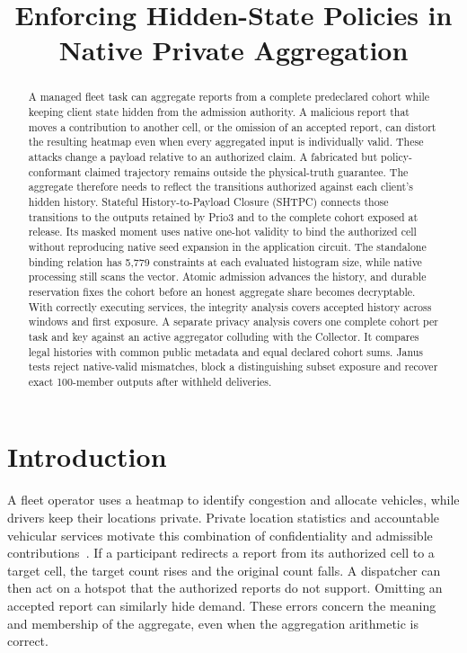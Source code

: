 \documentclass[conference,compsoc]{IEEEtran}
\theoremstyle{definition}
\numberwithin{equation}{section}
\numberwithin{table}{section}
\numberwithin{figure}{section}
\theoremstyle{plain}
\begin{document}
\title{Enforcing Hidden-State Policies in Native Private Aggregation}
\author{}
\maketitle
\begin{abstract}
A managed fleet task can aggregate reports from a complete predeclared cohort
while keeping client state hidden from the admission authority. A malicious report that
moves a contribution to another cell, or the omission of an accepted report,
can distort the resulting heatmap even when every aggregated input is individually
valid. These attacks change a payload relative to an authorized claim. A fabricated
but policy-conformant claimed trajectory remains outside the physical-truth
guarantee. The aggregate therefore needs to reflect the transitions authorized against
each client's hidden history. Stateful History-to-Payload Closure (SHTPC)
connects those transitions to the outputs retained by Prio3 and to the complete
cohort exposed at release. Its masked moment uses native one-hot validity to
bind the authorized cell without reproducing native seed expansion in the
application circuit. The standalone binding relation has 5,779 constraints at
each evaluated histogram size, while native processing still scans the vector.
Atomic admission advances the history, and durable reservation fixes the cohort
before an honest aggregate share becomes decryptable. With correctly executing
services, the integrity analysis covers accepted history across windows and
first exposure. A separate privacy analysis covers one complete cohort per
task and key against an active aggregator colluding with the Collector. It
compares legal histories with common public metadata and equal declared cohort
sums. Janus tests reject native-valid mismatches, block a distinguishing
subset exposure and recover exact 100-member outputs after withheld deliveries.
\end{abstract}
\section{Introduction}
\label{sec:intro}

A fleet operator uses a heatmap to identify congestion and allocate vehicles,
while drivers keep their locations private. Private location statistics and
accountable vehicular services motivate this combination of confidentiality
and admissible contributions~\cite{Popa2011PrivStats,Popa2009VPriv,Balasch2010PrETP}.
If a participant redirects a
report from its authorized cell to a target cell, the target count rises and
the original count falls. A dispatcher can then act on a hotspot that the
authorized reports do not support. Omitting an accepted report can similarly
hide demand. These errors concern the meaning and membership of the aggregate,
even when the aggregation arithmetic is correct.
\end{document}
